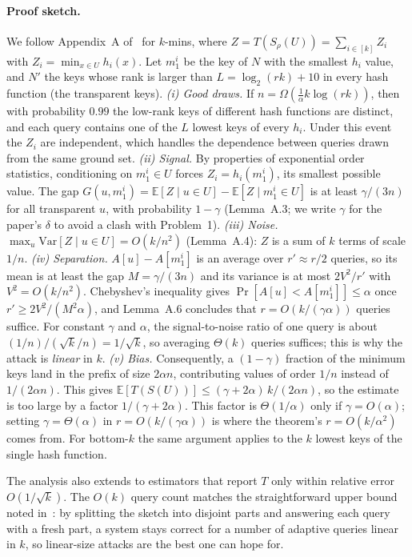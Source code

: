 \documentclass{cccg20}
\newcommand{\E}{\mathbb{E}}
\newcommand{\Var}{\mathrm{Var}}
\begin{document}
\paragraph{Proof sketch.}
We follow Appendix~A of~\cite{ahmadian2024} for $k$-mins, where $Z=T(S_\rho(U))=\sum_{i\in[k]}Z_i$ with $Z_i=\min_{x\in U}h_i(x)$. Let $m^i_1$ be the key of $N$ with the smallest $h_i$ value, and $N'$ the keys whose rank is larger than $L=\log_2(rk)+10$ in every hash function (the transparent keys).
\emph{(i) Good draws.} If $n=\Omega(\frac{1}{\alpha}k\log(rk))$, then with probability $0.99$ the low-rank keys of different hash functions are distinct, and each query contains one of the $L$ lowest keys of every $h_i$. Under this event the $Z_i$ are independent, which handles the dependence between queries drawn from the same ground set.
\emph{(ii) Signal.} By properties of exponential order statistics, conditioning on $m^i_1\in U$ forces $Z_i=h_i(m^i_1)$, its smallest possible value. The gap $G(u,m^i_1)=\E[Z\mid u\in U]-\E[Z\mid m^i_1\in U]$ is at least $\gamma/(3n)$ for all transparent $u$, with probability $1-\gamma$ (Lemma~A.3; we write $\gamma$ for the paper's $\delta$ to avoid a clash with Problem~1).
\emph{(iii) Noise.} $\max_u \Var[Z\mid u\in U]=O(k/n^2)$ (Lemma~A.4): $Z$ is a sum of $k$ terms of scale $1/n$.
\emph{(iv) Separation.} $A[u]-A[m^i_1]$ is an average over $r'\approx r/2$ queries, so its mean is at least the gap $M=\gamma/(3n)$ and its variance is at most $2V^2/r'$ with $V^2=O(k/n^2)$. Chebyshev's inequality gives $\Pr[A[u]<A[m^i_1]]\le\alpha$ once $r'\ge 2V^2/(M^2\alpha)$, and Lemma~A.6 concludes that $r=O(k/(\gamma\alpha))$ queries suffice. For constant $\gamma$ and $\alpha$, the signal-to-noise ratio of one query is about $(1/n)/(\sqrt k/n)=1/\sqrt k$, so averaging $\Theta(k)$ queries suffices; this is why the attack is \emph{linear} in $k$.
\emph{(v) Bias.} Consequently, a $(1-\gamma)$ fraction of the minimum keys land in the prefix of size $2\alpha n$, contributing values of order $1/n$ instead of $1/(2\alpha n)$. This gives $\E[T(S(U))]\le(\gamma+2\alpha)\,k/(2\alpha n)$, so the estimate is too large by a factor $1/(\gamma+2\alpha)$. This factor is $\Theta(1/\alpha)$ only if $\gamma=O(\alpha)$; setting $\gamma=\Theta(\alpha)$ in $r=O(k/(\gamma\alpha))$ is where the theorem's $r=O(k/\alpha^2)$ comes from. For bottom-$k$ the same argument applies to the $k$ lowest keys of the single hash function. \QED

The analysis also extends to estimators that report $T$ only within relative error $O(1/\sqrt{k})$. The $O(k)$ query count matches the straightforward upper bound noted in~\cite{ahmadian2024}: by splitting the sketch into disjoint parts and answering each query with a fresh part, a system stays correct for a number of adaptive queries linear in $k$, so linear-size attacks are the best one can hope for.
\end{document}
